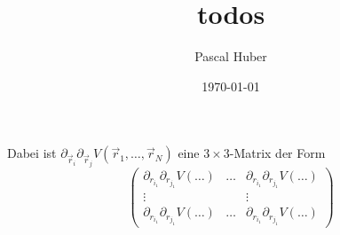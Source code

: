 \documentclass[11pt]{article}
\title{todos}
\author{Pascal Huber}
\date{\today}
\begin{document}
\maketitle

\setcounter{tocdepth}{3}
\tableofcontents
\vspace*{1cm}
Dabei ist \(\partial_{\vec{r}_i} \partial_{\vec{r}_j} V(\vec{r}_1, \dots, \vec{r}_N)\) eine \(3\times 3\)-Matrix der Form
\[
\begin{pmatrix}
\partial_{r_{i_1}}\partial_{r_{j_1}} V(\dots) & \dots & \partial_{r_{i_1}}\partial_{r_{j_1}} V(\dots) \\
\vdots & & \vdots \\
\partial_{r_{i_1}}\partial_{r_{j_1}} V(\dots) & \dots & \partial_{r_{i_1}}\partial_{r_{j_1}} V(\dots)
\end{pmatrix}
\]
\end{document}
